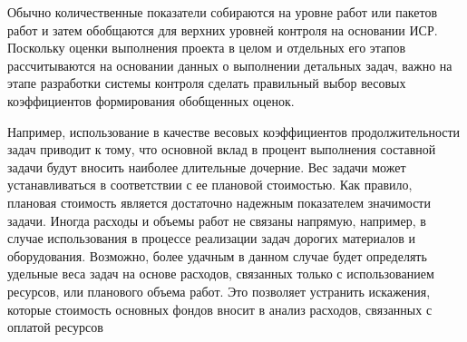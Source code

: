 Обычно количественные показатели собираются на уровне работ или пакетов работ и затем обобщаются для верхних уровней контроля на основании ИСР.
Поскольку оценки выполнения проекта в целом и отдельных его этапов рассчитываются на основании данных о выполнении детальных задач, важно на этапе разработки системы контроля сделать правильный выбор весовых коэффициентов формирования обобщенных оценок.

Например, использование в качестве весовых коэффициентов продолжительности задач приводит к тому, что основной вклад в процент выполнения составной задачи будут вносить наиболее длительные дочерние.
Вес задачи может устанавливаться в соответствии с ее плановой стоимостью.
Как правило, плановая стоимость является достаточно надежным показателем значимости задачи.
Иногда расходы и объемы работ не связаны напрямую, например, в случае использования в процессе реализации задач дорогих материалов и оборудования.
Возможно, более удачным в данном случае будет определять удельные веса задач на основе расходов, связанных только с использованием ресурсов, или планового объема работ. Это позволяет устранить искажения, которые стоимость основных фондов вносит в анализ расходов, связанных с оплатой ресурсов \cite{darovskih}